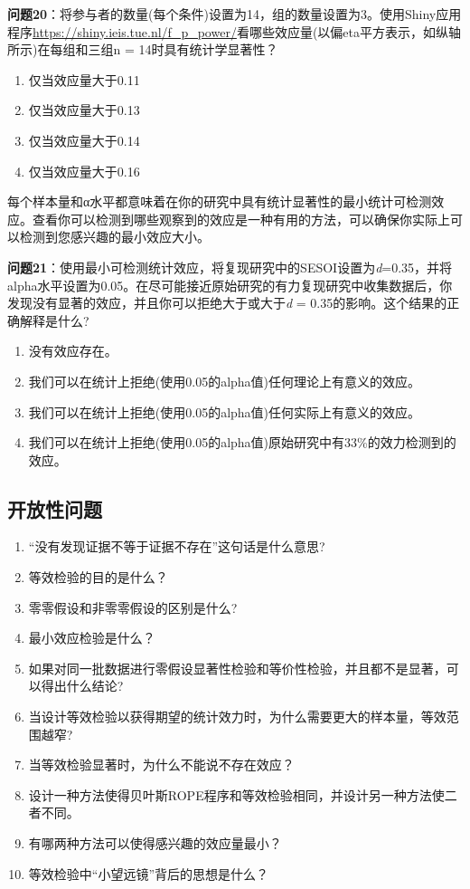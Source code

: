 \documentclass[
  letterpaper,
  DIV=11,
  numbers=noendperiod]{scrreprt}
\providecommand{\tightlist}{%
  \setlength{\itemsep}{0pt}\setlength{\parskip}{0pt}}\usepackage{longtable,booktabs,array}
\begin{document}
\textbf{问题20}：将参与者的数量(每个条件)设置为14，组的数量设置为3。使用Shiny应用程序\url{https://shiny.ieis.tue.nl/f_p_power/}看哪些效应量(以偏eta平方表示，如纵轴所示)在每组和三组n
= 14时具有统计学显著性？

\begin{enumerate}
\def\labelenumi{\Alph{enumi})}
\tightlist
\item
  仅当效应量大于0.11
\item
  仅当效应量大于0.13
\item
  仅当效应量大于0.14
\item
  仅当效应量大于0.16
\end{enumerate}

每个样本量和α水平都意味着在你的研究中具有统计显著性的最小统计可检测效应。查看你可以检测到哪些观察到的效应是一种有用的方法，可以确保你实际上可以检测到您感兴趣的最小效应大小。

\textbf{问题21}：使用最小可检测统计效应，将复现研究中的SESOI设置为\emph{d}=0.35，并将alpha水平设置为0.05。在尽可能接近原始研究的有力复现研究中收集数据后，你发现没有显著的效应，并且你可以拒绝大于或大于\emph{d}
= 0.35的影响。这个结果的正确解释是什么?

\begin{enumerate}
\def\labelenumi{\Alph{enumi})}
\tightlist
\item
  没有效应存在。
\item
  我们可以在统计上拒绝(使用0.05的alpha值)任何理论上有意义的效应。
\item
  我们可以在统计上拒绝(使用0.05的alpha值)任何实际上有意义的效应。
\item
  我们可以在统计上拒绝(使用0.05的alpha值)原始研究中有33\%的效力检测到的效应。
\end{enumerate}

\hypertarget{ux5f00ux653eux6027ux95eeux9898-1}{%
\subsection{开放性问题}\label{ux5f00ux653eux6027ux95eeux9898-1}}

\begin{enumerate}
\def\labelenumi{\arabic{enumi}.}
\item
  ``没有发现证据不等于证据不存在''这句话是什么意思?
\item
  等效检验的目的是什么？
\item
  零零假设和非零零假设的区别是什么?
\item
  最小效应检验是什么？
\item
  如果对同一批数据进行零假设显著性检验和等价性检验，并且都不是显著，可以得出什么结论?
\item
  当设计等效检验以获得期望的统计效力时，为什么需要更大的样本量，等效范围越窄?
\item
  当等效检验显著时，为什么不能说不存在效应？
\item
  设计一种方法使得贝叶斯ROPE程序和等效检验相同，并设计另一种方法使二者不同。
\item
  有哪两种方法可以使得感兴趣的效应量最小？
\item
  等效检验中``小望远镜''背后的思想是什么？
\end{enumerate}
\end{document}
